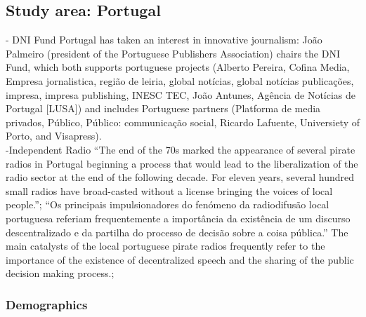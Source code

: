 \subsection{Study area: Portugal}
- DNI Fund {\color{orange}Portugal has taken an interest in innovative journalism: João Palmeiro (president of the Portuguese Publishers Association) chairs the DNI Fund, which both supports portuguese projects (Alberto Pereira, Cofina Media, Empresa jornalistica, região de leiria, global notícias, global notícias publicações, impresa, impresa publishing, INESC TEC, João Antunes, Agência de Notícias de Portugal [LUSA]) and includes Portuguese partners (Platforma de media privados, Público, Público: communicação social, Ricardo Lafuente, Universiety of Porto, and Visapress). \cite{DNIFund2018}}\\
-Independent Radio {“The end of the 70s marked the appearance of several pirate radios in Portugal beginning a process that would lead to the liberalization of the radio sector at the end of the following decade. For eleven years, several hundred small radios have broad-casted without a license bringing the voices of local people.”\cite{Bonixe2019}}; {“Os principais impulsionadores do fenómeno da radiodifusão local portuguesa referiam frequentemente a importância da existência de um discurso descentralizado e da partilha do processo de decisão sobre a coisa pública.” The main catalysts of the local portuguese pirate radios frequently refer to the importance of the existence of decentralized speech and the sharing of the public decision making process.\cite{Bonixe2019}};

\subsubsection{Demographics}
